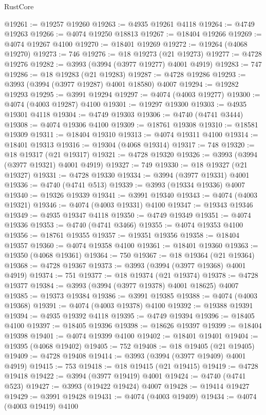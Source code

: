 \begin{lexlean}{RustCore}
\begin{coremodule}
@19261 := @19257 @19260
@19263 := @4935 @19261 @4118
@19264 := @4749 @19263
@19266 := @4074 @19250 @18813
@19267 := @18404 @19266
@19269 := @4074 @19267 @4100
@19270 := @18401 @19269
@19272 := @19264 (@4068 @19270)
@19273 := 746
@19276 := @18 @19273 (@21 @19273)
@19277 := @4728 @19276
@19282 := @3993 (@3994 (@3977 @19277) @4001 @4919)
@19283 := 747
@19286 := @18 @19283 (@21 @19283)
@19287 := @4728 @19286
@19293 := @3993 (@3994 (@3977 @19287) @4001 @18580) @4007
@19294 := @19282 @19293
@19295 := @3991 @19294
@19297 := @4074 (@4003 @19277)
@19300 := @4074 (@4003 @19287) @4100
@19301 := @19297 @19300
@19303 := @4935 @19301 @4118
@19304 := @4749 @19303
@19306 := @4740 (@4741 @3444)
@19308 := @4074 @19306 @4100
@19309 := @18761 @19308
@19310 := @18581 @19309
@19311 := @18404 @19310
@19313 := @4074 @19311 @4100
@19314 := @18401 @19313
@19316 := @19304 (@4068 @19314)
@19317 := 748
@19320 := @18 @19317 (@21 @19317)
@19321 := @4728 @19320
@19326 := @3993 (@3994 (@3977 @19321) @4001 @4919)
@19327 := 749
@19330 := @18 @19327 (@21 @19327)
@19331 := @4728 @19330
@19334 := @3994 (@3977 @19331) @4001
@19336 := @4740 (@4741 @513)
@19339 := @3993 (@19334 @19336) @4007
@19340 := @19326 @19339
@19341 := @3991 @19340
@19343 := @4074 (@4003 @19321)
@19346 := @4074 (@4003 @19331) @4100
@19347 := @19343 @19346
@19349 := @4935 @19347 @4118
@19350 := @4749 @19349
@19351 := @4074 @19336
@19353 := @4740 (@4741 @3466)
@19355 := @4074 @19353 @4100
@19356 := @18761 @19355
@19357 := @19351 @19356
@19358 := @18404 @19357
@19360 := @4074 @19358 @4100
@19361 := @18401 @19360
@19363 := @19350 (@4068 @19361)
@19364 := 750
@19367 := @18 @19364 (@21 @19364)
@19368 := @4728 @19367
@19373 := @3993 (@3994 (@3977 @19368) @4001 @4919)
@19374 := 751
@19377 := @18 @19374 (@21 @19374)
@19378 := @4728 @19377
@19384 := @3993 (@3994 (@3977 @19378) @4001 @18625) @4007
@19385 := @19373 @19384
@19386 := @3991 @19385
@19388 := @4074 (@4003 @19368)
@19391 := @4074 (@4003 @19378) @4100
@19392 := @19388 @19391
@19394 := @4935 @19392 @4118
@19395 := @4749 @19394
@19396 := @18405 @4100
@19397 := @18405 @19396
@19398 := @18626 @19397
@19399 := @18404 @19398
@19401 := @4074 @19399 @4100
@19402 := @18401 @19401
@19404 := @19395 (@4068 @19402)
@19405 := 752
@19408 := @18 @19405 (@21 @19405)
@19409 := @4728 @19408
@19414 := @3993 (@3994 (@3977 @19409) @4001 @4919)
@19415 := 753
@19418 := @18 @19415 (@21 @19415)
@19419 := @4728 @19418
@19422 := @3994 (@3977 @19419) @4001
@19424 := @4740 (@4741 @523)
@19427 := @3993 (@19422 @19424) @4007
@19428 := @19414 @19427
@19429 := @3991 @19428
@19431 := @4074 (@4003 @19409)
@19434 := @4074 (@4003 @19419) @4100

\end{coremodule}
\end{lexlean}
